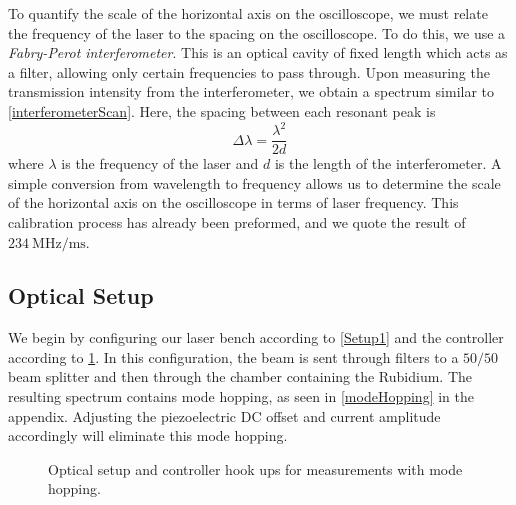 \documentclass[12pt]{article}
\begin{document}
	To quantify the scale of the horizontal axis on the oscilloscope, we must relate the frequency of the laser to the spacing on the oscilloscope. To do this, we use a \emph{Fabry-Perot interferometer}. This is an optical cavity of fixed length which acts as a filter, allowing only certain frequencies to pass through. Upon measuring the transmission intensity from the interferometer, we obtain a spectrum similar to \cref{interferometerScan}. Here, the spacing between each resonant peak is 
	\begin{equation}
		\Delta \lambda = \frac{\lambda^2}{2d}
	\end{equation}
	where $\lambda$ is the frequency of the laser and $d$ is the length of the interferometer. A simple conversion from wavelength to frequency allows us to determine the scale of the horizontal axis on the oscilloscope in terms of laser frequency. This calibration process has already been preformed, and we quote the result of $234 \ \text{MHz/ms}$.
	
	
	\subsection{Optical Setup}
	We begin by configuring our laser bench according to \cref{Setup1} and the controller according to \cref{Controller1}. In this configuration, the beam is sent through filters to a $50/50$ beam splitter and then through the chamber containing the Rubidium. The resulting spectrum contains mode hopping, as seen in \cref{modeHopping} in the appendix. Adjusting the piezoelectric DC offset and current amplitude accordingly will eliminate this mode hopping.
	
	\begin{figure}[H]
		\centering
		\qquad
		\caption{Optical setup and controller hook ups for measurements with mode hopping.}
		\label{Controller1}		
	\end{figure}
	
\end{document}
